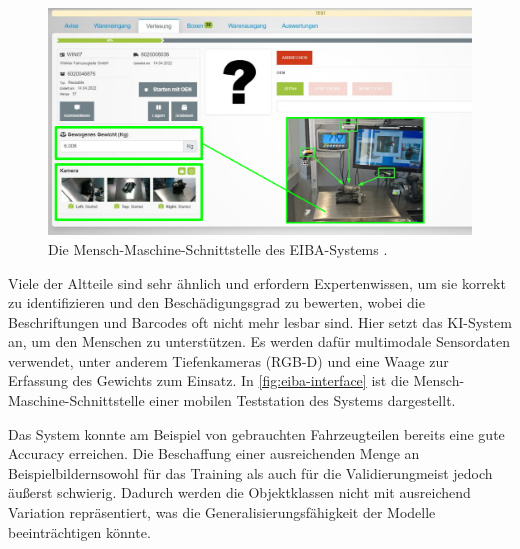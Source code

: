 \begin{figure}[b!]
	\centering
	\includegraphics[width=\textwidth]{images/figure_eiba_interface.png}
	\caption[Die Mensch-Maschine-Schnittstelle des EIBA-Systems.]{Die Mensch-Maschine-Schnittstelle des EIBA-Systems \parencite{Wagner2022reziprok}.}
	\label{fig:eiba-interface}
\end{figure}

Viele der Altteile sind sehr ähnlich und erfordern Expertenwissen, um sie korrekt zu identifizieren und den Beschädigungsgrad zu bewerten, wobei die Beschriftungen und Barcodes oft nicht mehr lesbar sind. Hier setzt das KI-System an, um den Menschen zu unterstützen. Es werden dafür multimodale Sensordaten verwendet, unter anderem Tiefenkameras (RGB-D) und eine Waage zur Erfassung des Gewichts zum Einsatz. In \autoref{fig:eiba-interface} ist die Mensch-Maschine-Schnittstelle einer mobilen Teststation des Systems dargestellt.

Das System konnte am Beispiel von gebrauchten Fahrzeugteilen bereits eine gute Accuracy erreichen. Die Beschaffung einer ausreichenden Menge an Beispielbildern\textemdash sowohl für das Training als auch für die Validierung\textemdash meist jedoch äußerst schwierig. Dadurch werden die Objektklassen nicht mit ausreichend Variation repräsentiert, was die Generalisierungsfähigkeit der Modelle beeinträchtigen könnte.

